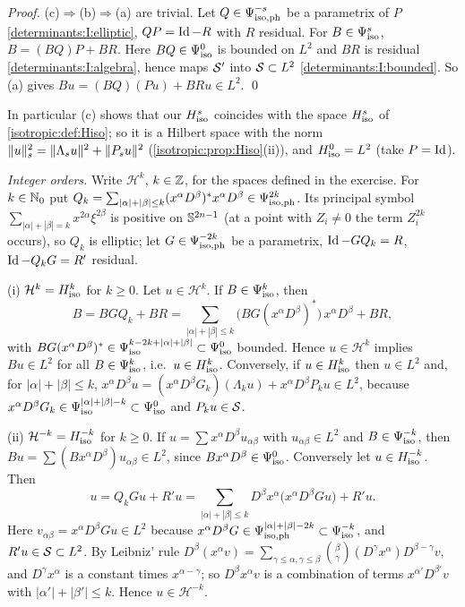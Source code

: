 \emph{Proof.} (c)$\Rightarrow$(b)$\Rightarrow$(a) are trivial. Let $Q\in\Psi^{-s}_{\mathrm{iso,ph}}$ be a
parametrix of $P$ \ref{determinants:I:elliptic}, $QP=\operatorname{Id}-R$ with $R$ residual. For
$B\in\Psi^{s}_{\mathrm{iso}}$, $B=(BQ)P+BR$. Here $BQ\in\Psi^{0}_{\mathrm{iso}}$ is bounded on $L^2$ and $BR$ is residual
\ref{determinants:I:algebra}, hence maps $\mathcal{S}'$ into $\mathcal{S}\subset L^2$ \ref{determinants:I:bounded}.
So (a) gives $Bu=(BQ)(Pu)+BRu\in L^2$. \qed

In particular (c) shows that our $H^{s}_{\mathrm{iso}}$ coincides with the space $H^{s}_{\mathrm{iso}}$ of
\cref{isotropic:def:Hiso}; so it is a Hilbert space with the norm
$\lVert u\rVert_s^2=\lVert \Lambda_su\rVert^2+\lVert P_su\rVert^2$ (\cref{isotropic:prop:Hiso}(ii)), and
$H^{0}_{\mathrm{iso}}=L^2$ (take $P=\operatorname{Id}$).

\emph{Integer orders.} Write $\mathcal H^k$, $k\in\mathbb{Z}$, for the spaces defined in the exercise. For
$k\in\mathbb{N}_0$ put $Q_k=\sum_{|\alpha|+|\beta|\le k}(x^\alpha D^\beta)^*x^\alpha D^\beta\in\Psi^{2k}_{\mathrm{iso,ph}}$.
Its principal symbol $\sum_{|\alpha|+|\beta|=k}x^{2\alpha}\xi^{2\beta}$ is positive on
$\mathbb{S}^{2n-1}$ (at a point with $Z_i\neq0$ the term $Z_i^{2k}$ occurs), so $Q_k$ is elliptic; let
$G\in\Psi^{-2k}_{\mathrm{iso,ph}}$ be a parametrix, $\operatorname{Id}-GQ_k=R$, $\operatorname{Id}-Q_kG=R'$ residual.

(i) $\mathcal H^k=H^{k}_{\mathrm{iso}}$ for $k\ge0$. Let $u\in\mathcal H^k$. If $B\in\Psi^{k}_{\mathrm{iso}}$, then
\begin{equation*}
  B=BGQ_k+BR=\sum_{|\alpha|+|\beta|\le k}\bigl(BG(x^\alpha D^\beta)^*\bigr)\,x^\alpha D^\beta+BR,
\end{equation*}
with $BG(x^\alpha D^\beta)^*\in\Psi^{k-2k+|\alpha|+|\beta|}_{\mathrm{iso}}\subset\Psi^{0}_{\mathrm{iso}}$ bounded. Hence
$u\in\mathcal H^k$ implies $Bu\in L^2$ for all $B\in\Psi^{k}_{\mathrm{iso}}$, i.e.\ $u\in H^{k}_{\mathrm{iso}}$.
Conversely, if $u\in H^{k}_{\mathrm{iso}}$ then $u\in L^2$ and, for $|\alpha|+|\beta|\le k$,
$x^\alpha D^\beta u=(x^\alpha D^\beta G_k)(\Lambda_ku)+x^\alpha D^\beta P_ku\in L^2$, because
$x^\alpha D^\beta G_k\in\Psi^{|\alpha|+|\beta|-k}_{\mathrm{iso}}\subset\Psi^{0}_{\mathrm{iso}}$ and $P_ku\in\mathcal{S}$.

(ii) $\mathcal H^{-k}=H^{-k}_{\mathrm{iso}}$ for $k\ge0$. If $u=\sum x^\alpha D^\beta u_{\alpha\beta}$ with
$u_{\alpha\beta}\in L^2$ and $B\in\Psi^{-k}_{\mathrm{iso}}$, then
$Bu=\sum(Bx^\alpha D^\beta)u_{\alpha\beta}\in L^2$, since $Bx^\alpha D^\beta\in\Psi^{0}_{\mathrm{iso}}$. Conversely let
$u\in H^{-k}_{\mathrm{iso}}$. Then
\begin{equation*}
  u=Q_kGu+R'u=\sum_{|\alpha|+|\beta|\le k}D^\beta x^\alpha\bigl(x^\alpha D^\beta Gu\bigr)+R'u .
\end{equation*}
Here $v_{\alpha\beta}=x^\alpha D^\beta G u\in L^2$ because $x^\alpha D^\beta G\in\Psi^{|\alpha|+|\beta|-2k}_{\mathrm{iso,ph}}
\subset\Psi^{-k}_{\mathrm{iso}}$, and $R'u\in\mathcal{S}\subset L^2$. By Leibniz' rule
$D^\beta(x^\alpha v)=\sum_{\gamma\le\alpha,\gamma\le\beta}\binom\beta\gamma(D^\gamma x^\alpha)D^{\beta-\gamma}v$,
and $D^\gamma x^\alpha$ is a constant times $x^{\alpha-\gamma}$; so $D^\beta x^\alpha v$ is a combination of
terms $x^{\alpha'}D^{\beta'}v$ with $|\alpha'|+|\beta'|\le k$. Hence $u\in\mathcal H^{-k}$.

